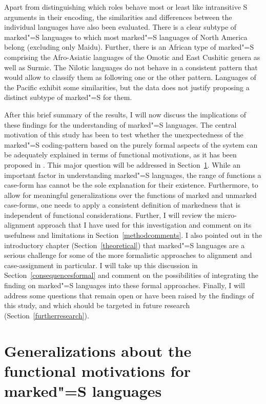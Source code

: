 Apart from distinguishing which roles behave most or least like intransitive S arguments in their encoding, the similarities and differences between the individual languages have also been evaluated. 
There is a clear subtype of marked"=S languages to which most marked"=S languages of North America belong (excluding only Maidu). 
Further, there is an African type of marked"=S comprising the Afro-Asiatic languages of the Omotic and East Cushitic genera as well as Surmic. 
The Nilotic languages do not behave in a consistent pattern that would allow to classify them as following one or the other pattern. 
Languages of the Pacific exhibit some similarities, but the data does not justify proposing a distinct subtype of marked"=S for them.%

After this brief summary of the results, I will now discuss the implications of these findings for the understanding of marked"=S languages.
The central motivation of this study has been to test whether the unexpectedness of the marked"=S coding-pattern based on the purely formal aspects of the system can be adequately explained in terms of functional motivations, as it has been proposed in \citet{Koenig:2006}. 
This major question will be addressed in Section~\ref{discussion}. While an important factor in understanding marked"=S languages, the range of functions a case-form has cannot be the sole explanation for their existence. 
Furthermore, to allow for meaningful generalizations over the functions of marked and unmarked case-forms, one needs to apply a consistent definition of markedness that is independent of functional considerations.
Further, I will review the micro-alignment approach that I have used for this investigation and comment on its usefulness and limitations in Section~\ref{methodcomments}.
I also pointed out in the introductory chapter (Section~\ref{theoretical}) that marked"=S languages are a serious challenge for some of the more formalistic approaches to alignment and case-assignment in particular. 
I will take up this discussion in Section~\ref{consequencesformal} and comment on the possibilities of integrating the finding on marked"=S languages into these formal approaches. 
Finally, I will address some questions that remain open or have been raised by the findings of this study, and which should be targeted in future research (Section~\ref{furtherresearch}).  

\section{Generalizations about the functional motivations for marked"=S languages}\label{discussion}

